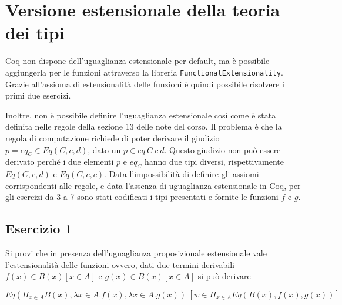 \newpage
\section{Versione estensionale della teoria dei tipi}
Coq non dispone dell'uguaglianza estensionale per default, ma è possibile aggiungerla per le funzioni attraverso la libreria \texttt{FunctionalExtensionality}. Grazie all'assioma di estensionalità delle funzioni è quindi possibile risolvere i primi due esercizi.

Inoltre, non è possibile definire l'uguaglianza estensionale così come è stata definita nelle regole della sezione 13 delle note del corso. Il problema è che la regola di computazione richiede di poter derivare il giudizio $p=eq_C\in Eq(C,c,d)$, dato un $p\in eq~C~c~d$. Questo giudizio non può essere derivato perché i due elementi $p $ e $eq_C$ hanno due tipi diversi, rispettivamente $Eq(C,c,d)$ e $Eq(C,c,c)$. Data l'impossibilità di definire gli assiomi corrispondenti alle regole, e data l'assenza di uguaglianza estensionale in Coq, per gli esercizi da 3 a 7 sono stati codificati i tipi presentati e fornite le funzioni $f$ e $g$.

%

\subsection{Esercizio 1}
\begin{thm}
	Si provi che in presenza dell’uguaglianza proposizionale estensionale vale l’estensionalità delle funzioni ovvero, dati due termini derivabili $f(x)\in B(x) [x\in A]$ e $g(x)\in B(x) [x\in A]$ si può	derivare
	
	\[ Eq(\Pi_{x\in A}B(x), \lambda x\in A.f(x), \lambda x\in A.g(x))~[w\in \Pi_{x\in A}Eq(B(x), f(x), g(x))]\]
\end{thm}


